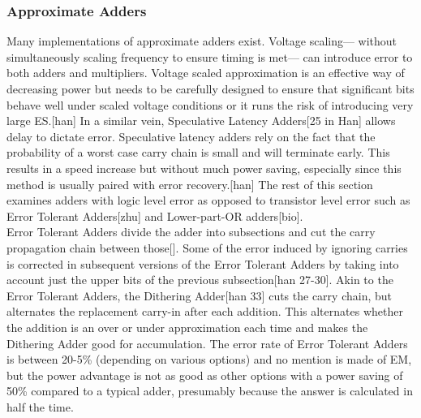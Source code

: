 \documentclass[journal]{IEEEtran}
\begin{document}
	\subsubsection{Approximate Adders}
	\indent Many implementations of approximate adders exist. Voltage scaling--- without simultaneously scaling frequency to ensure timing is met--- can introduce error to both adders and multipliers. Voltage scaled approximation is an effective way of decreasing power but needs to be carefully designed to ensure that significant bits behave well under scaled voltage conditions or it runs the risk of introducing very large ES.[han] In a similar vein, Speculative Latency Adders[25 in Han] allows delay to dictate error. Speculative latency adders rely on the fact that the probability of a worst case carry chain is small and will terminate early. This results in a speed increase but without much power saving, especially since this method is usually paired with error recovery.[han] The rest of this section examines adders with logic level error as opposed to transistor level error such as Error Tolerant Adders[zhu] and Lower-part-OR adders[bio]. \\
	\indent Error Tolerant Adders divide the adder into subsections and cut the carry propagation chain between those[]. Some of the error induced by ignoring carries is corrected in subsequent versions of the Error Tolerant Adders by taking into account just the upper bits of the previous subsection[han 27-30]. Akin to the Error Tolerant Adders, the Dithering Adder[han 33] cuts the carry chain, but alternates the replacement carry-in after each addition. This alternates whether the addition is an over or under approximation each time and makes the Dithering Adder good for accumulation. The error rate of Error Tolerant Adders is between 20-5\% (depending on various options) and no mention is made of EM, but the power advantage is not as good as other options with a power saving of 50\% compared to a typical adder, presumably because the answer is calculated in half the time.\\
\end{document}
